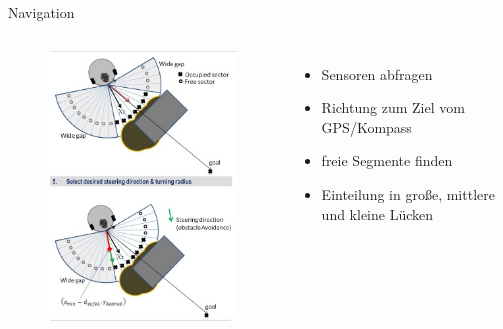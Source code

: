 \begin{frame}{Navigation}
\begin{columns}
\column{0.49\paperwidth}
\vspace{-0.5cm}
\begin{figure}
\center
\includegraphics[height=.85\textheight]{Plots/navigation1}
\end{figure}
\column{0.49\paperwidth}
\begin{itemize}
\item Sensoren abfragen
\item Richtung zum Ziel vom GPS/Kompass
\\[1cm]
\item freie Segmente finden
\item Einteilung in große, mittlere und kleine Lücken
\end{itemize}
\end{columns}
\end{frame}


